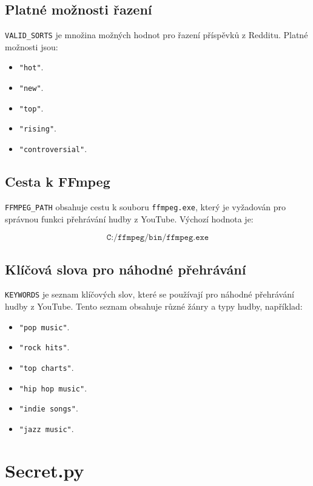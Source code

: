\documentclass[12pt, a4paper]{report}
\begin{document}
\subsection{Platné možnosti řazení}

\texttt{VALID\_SORTS} je množina možných hodnot pro řazení příspěvků z Redditu. Platné možnosti jsou:

\begin{itemize}
    \item \texttt{"hot"}.
    \item \texttt{"new"}.
    \item \texttt{"top"}.
    \item \texttt{"rising"}.
    \item \texttt{"controversial"}.
\end{itemize}

\subsection{Cesta k FFmpeg}

\texttt{FFMPEG\_PATH} obsahuje cestu k souboru \texttt{ffmpeg.exe}, který je vyžadován pro správnou funkci přehrávání hudby z YouTube. Výchozí hodnota je:

\[
\texttt{C:/ffmpeg/bin/ffmpeg.exe}
\]

\subsection{Klíčová slova pro náhodné přehrávání}

\texttt{KEYWORDS} je seznam klíčových slov, které se používají pro náhodné přehrávání hudby z YouTube. Tento seznam obsahuje různé žánry a typy hudby, například:

\begin{itemize}
    \item \texttt{"pop music"}.
    \item \texttt{"rock hits"}.
    \item \texttt{"top charts"}.
    \item \texttt{"hip hop music"}.
    \item \texttt{"indie songs"}.
    \item \texttt{"jazz music"}.
\end{itemize}

\section{Secret.py}
\end{document}
